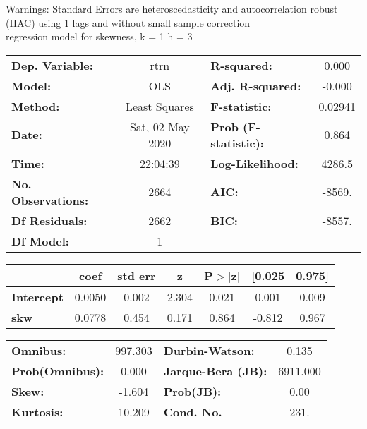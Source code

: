 Warnings: \newline
 [1] Standard Errors are heteroscedasticity and autocorrelation robust (HAC) using 1 lags and without small sample correction\\ 

regression model for skewness, k = 1 h = 3\begin{center}
\begin{tabular}{lclc}
\toprule
\textbf{Dep. Variable:}    &       rtrn       & \textbf{  R-squared:         } &     0.000   \\
\textbf{Model:}            &       OLS        & \textbf{  Adj. R-squared:    } &    -0.000   \\
\textbf{Method:}           &  Least Squares   & \textbf{  F-statistic:       } &   0.02941   \\
\textbf{Date:}             & Sat, 02 May 2020 & \textbf{  Prob (F-statistic):} &    0.864    \\
\textbf{Time:}             &     22:04:39     & \textbf{  Log-Likelihood:    } &    4286.5   \\
\textbf{No. Observations:} &        2664      & \textbf{  AIC:               } &    -8569.   \\
\textbf{Df Residuals:}     &        2662      & \textbf{  BIC:               } &    -8557.   \\
\textbf{Df Model:}         &           1      & \textbf{                     } &             \\
\bottomrule
\end{tabular}
\begin{tabular}{lcccccc}
                   & \textbf{coef} & \textbf{std err} & \textbf{z} & \textbf{P$> |$z$|$} & \textbf{[0.025} & \textbf{0.975]}  \\
\midrule
\textbf{Intercept} &       0.0050  &        0.002     &     2.304  &         0.021        &        0.001    &        0.009     \\
\textbf{skw}       &       0.0778  &        0.454     &     0.171  &         0.864        &       -0.812    &        0.967     \\
\bottomrule
\end{tabular}
\begin{tabular}{lclc}
\textbf{Omnibus:}       & 997.303 & \textbf{  Durbin-Watson:     } &    0.135  \\
\textbf{Prob(Omnibus):} &   0.000 & \textbf{  Jarque-Bera (JB):  } & 6911.000  \\
\textbf{Skew:}          &  -1.604 & \textbf{  Prob(JB):          } &     0.00  \\
\textbf{Kurtosis:}      &  10.209 & \textbf{  Cond. No.          } &     231.  \\
\bottomrule
\end{tabular}
\end{center}

